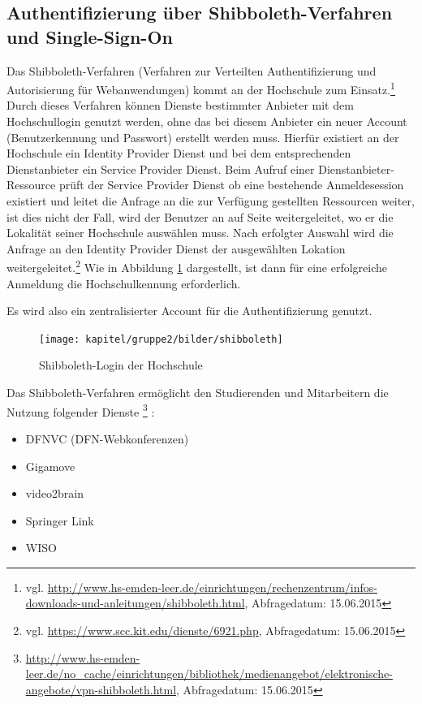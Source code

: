 \subsection{Authentifizierung über Shibboleth-Verfahren und Single-Sign-On}

Das Shibboleth-Verfahren (Verfahren zur Verteilten Authentifizierung und Autorisierung für Webanwendungen) kommt an der Hochschule zum Einsatz.\footnote{vgl. \url{http://www.hs-emden-leer.de/einrichtungen/rechenzentrum/infos-downloads-und-anleitungen/shibboleth.html}, Abfragedatum: 15.06.2015}  Durch dieses Verfahren können Dienste bestimmter Anbieter mit dem Hochschullogin genutzt werden, ohne das bei diesem Anbieter ein neuer Account (Benutzerkennung und Passwort) erstellt werden muss. Hierfür existiert an der Hochschule ein Identity Provider Dienst und bei dem entsprechenden Dienstanbieter ein Service Provider Dienst.  Beim Aufruf einer Dienstanbieter-Ressource prüft der Service Provider Dienst ob eine bestehende Anmeldesession existiert und leitet die Anfrage an die zur Verfügung gestellten Ressourcen weiter, ist dies nicht der Fall, wird der Benutzer an auf Seite weitergeleitet, wo er die Lokalität seiner Hochschule auswählen muss. Nach erfolgter Auswahl wird die Anfrage an den Identity Provider Dienst der ausgewählten Lokation weitergeleitet.\footnote{vgl. \url{https://www.scc.kit.edu/dienste/6921.php}, Abfragedatum: 15.06.2015} Wie in Abbildung \ref{fig_shibboleth_hs} dargestellt, ist dann für eine erfolgreiche Anmeldung die Hochschulkennung erforderlich.

Es wird also ein zentralisierter Account für die Authentifizierung genutzt.  

\begin{figure}
	\centering
	\texttt{[image: kapitel/gruppe2/bilder/shibboleth]}
	\caption{Shibboleth-Login der Hochschule \protect\footnotemark}
	\label{fig_shibboleth_hs}
\end{figure}

Das Shibboleth-Verfahren ermöglicht den Studierenden und Mitarbeitern die Nutzung folgender Dienste \footnote{\url{http://www.hs-emden-leer.de/no_cache/einrichtungen/bibliothek/medienangebot/elektronische-angebote/vpn-shibboleth.html}, Abfragedatum: 15.06.2015} :

\begin{itemize}
	\item DFNVC (DFN-Webkonferenzen)
	\item Gigamove
	\item video2brain
	\item Springer Link	
	\item WISO	
\end{itemize}

